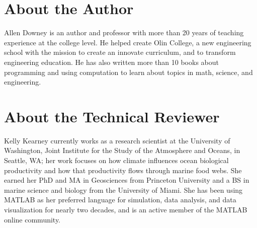 

\dominitoc
\dominilof
\dominilot
\thispagestyle{empty}
\null\vskip1.175in
\section*{About the Author}
Allen Downey is an author and professor with more than 20 years of teaching experience at the college level. He helped create Olin College, a new engineering school with the mission to create an innovate curriculum, and to transform engineering education. He has also written more than 10 books about programming and using computation to learn about topics in math, science, and engineering.
\section*{About the Technical Reviewer}
Kelly Kearney currently works as a research scientist at the University of Washington, Joint Institute for the Study of the Atmosphere and Oceans, in Seattle, WA; her work focuses on how climate influences ocean biological productivity and how that productivity flows through marine food webs. She earned her PhD and MA in Geosciences from Princeton University and a BS in marine science and biology from the University of Miami. She has been using MATLAB as her preferred language for simulation, data analysis, and data visualization for nearly two decades, and is an active member of the MATLAB online community.
\brieftableofcontents

\tableofcontents
\adjustmtc{}



\mainmatter


































\printindex


